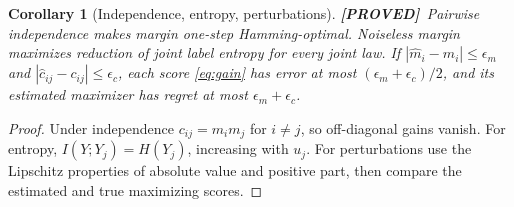 \documentclass[11pt]{article}
\newtheorem{corollary}[theorem]{Corollary}
\theoremstyle{definition}
\newcommand{\1}{\mathbf 1}
\newcommand{\pr}{\textbf{[PROVED]}}
\begin{document}
\begin{corollary}[Independence, entropy, perturbations]\label{cor:basic}
\pr\ Pairwise independence makes margin one-step Hamming-optimal.
Noiseless margin maximizes reduction of joint label entropy for every joint
law. If $|\widehat m_i-m_i|\le\epsilon_m$ and
$|\widehat c_{ij}-c_{ij}|\le\epsilon_c$, each score \eqref{eq:gain} has error
at most $(\epsilon_m+\epsilon_c)/2$, and its estimated maximizer has regret
at most $\epsilon_m+\epsilon_c$.
\end{corollary}
\begin{proof}
Under independence $c_{ij}=m_im_j$ for $i\ne j$, so off-diagonal gains vanish.
For entropy, $I(Y;Y_j)=H(Y_j)$, increasing with $u_j$.
For perturbations use the Lipschitz properties of absolute value and positive
part, then compare the estimated and true maximizing scores.
\end{proof}
\end{document}
